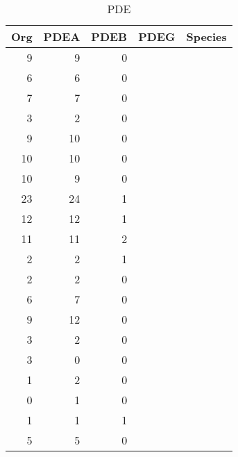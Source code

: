 \begin{table}[tbp]
\centering
\begin{tabular}{rrrll}
  \hline
Org & PDEA & PDEB & PDEG & Species \\ 
  \hline
  9 &   9 &   0 &  & \emph{} \\ 
    6 &   6 &   0 &  & \emph{} \\ 
    7 &   7 &   0 &  & \emph{} \\ 
    3 &   2 &   0 &  & \emph{} \\ 
    9 &  10 &   0 &  & \emph{} \\ 
   10 &  10 &   0 &  & \emph{} \\ 
   10 &   9 &   0 &  & \emph{} \\ 
   23 &  24 &   1 &  & \emph{} \\ 
   12 &  12 &   1 &  & \emph{} \\ 
   11 &  11 &   2 &  & \emph{} \\ 
    2 &   2 &   1 &  & \emph{} \\ 
    2 &   2 &   0 &  & \emph{} \\ 
    6 &   7 &   0 &  & \emph{} \\ 
    9 &  12 &   0 &  & \emph{} \\ 
    3 &   2 &   0 &  & \emph{} \\ 
    3 &   0 &   0 &  & \emph{} \\ 
    1 &   2 &   0 &  & \emph{} \\ 
    0 &   1 &   0 &  & \emph{} \\ 
    1 &   1 &   1 &  & \emph{} \\ 
    5 &   5 &   0 &  & \emph{} \\ 
   \hline
\end{tabular}
\caption{PDE} 
\label{tab:ChRhodAux_PDE}
\end{table}
